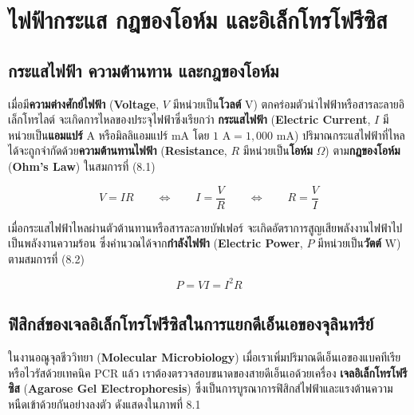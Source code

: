 \chapter{ไฟฟ้ากระแส กฎของโอห์ม และอิเล็กโทรโฟรีซิส}

\section{กระแสไฟฟ้า ความต้านทาน และกฎของโอห์ม}

เมื่อมี\textbf{ความต่างศักย์ไฟฟ้า} (\textbf{Voltage}, $V$ มีหน่วยเป็น\textbf{โวลต์} $\text{V}$) ตกคร่อมตัวนำไฟฟ้าหรือสารละลายอิเล็กโทรไลต์ จะเกิดการไหลของประจุไฟฟ้าซึ่งเรียกว่า \textbf{กระแสไฟฟ้า} (\textbf{Electric Current}, $I$ มีหน่วยเป็น\textbf{แอมแปร์} $\text{A}$ หรือมิลลิแอมแปร์ $\text{mA}$ โดย $1\text{ A} = 1{,}000\text{ mA}$) ปริมาณกระแสไฟฟ้าที่ไหลได้จะถูกจำกัดด้วย\textbf{ความต้านทานไฟฟ้า} (\textbf{Resistance}, $R$ มีหน่วยเป็น\textbf{โอห์ม} $\Omega$) ตาม\textbf{กฎของโอห์ม} (\textbf{Ohm's Law}) ในสมการที่ (8.1)

\begin{equation}
    V = I R \qquad \Longleftrightarrow \qquad I = \frac{V}{R} \qquad \Longleftrightarrow \qquad R = \frac{V}{I}
\end{equation}

เมื่อกระแสไฟฟ้าไหลผ่านตัวต้านทานหรือสารละลายบัฟเฟอร์ จะเกิดอัตราการสูญเสียพลังงานไฟฟ้าไปเป็นพลังงานความร้อน ซึ่งคำนวณได้จาก\textbf{กำลังไฟฟ้า} (\textbf{Electric Power}, $P$ มีหน่วยเป็น\textbf{วัตต์} $\text{W}$) ตามสมการที่ (8.2)

\begin{equation}
    P = V I = I^2 R
\end{equation}

\section{ฟิสิกส์ของเจลอิเล็กโทรโฟรีซิสในการแยกดีเอ็นเอของจุลินทรีย์}

ในงานอณูจุลชีววิทยา (\textbf{Molecular Microbiology}) เมื่อเราเพิ่มปริมาณดีเอ็นเอของแบคทีเรียหรือไวรัสด้วยเทคนิค PCR แล้ว เราต้องตรวจสอบขนาดของสายดีเอ็นเอด้วยเครื่อง \textbf{เจลอิเล็กโทรโฟรีซิส} (\textbf{Agarose Gel Electrophoresis}) ซึ่งเป็นการบูรณาการฟิสิกส์ไฟฟ้าและแรงต้านความหนืดเข้าด้วยกันอย่างลงตัว ดังแสดงใน\mbox{ภาพที่} 8.1

